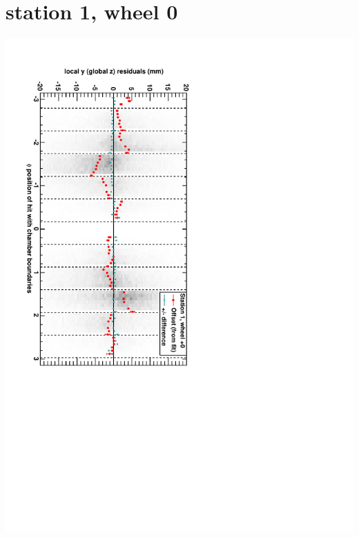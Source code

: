 \documentclass[compress]{beamer}
\begin{document}
\section*{station 1, wheel 0}
\begin{frame} \vfill \mbox{\hspace{-1 cm}\includegraphics[height=1.2\linewidth, angle=90]{DTzVsPhi_st1_whC.pdf}} \end{frame}
\end{document}
